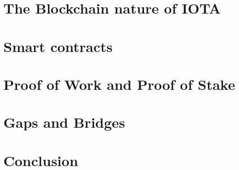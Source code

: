 \documentclass[a4paper,12pt,twoside]{book}
\begin{document}
\section{The Blockchain nature of IOTA}
\label{sec:IOTABlockchainNature}

\section{Smart contracts}
\label{sec:SmartContracts}

\section{Proof of Work and Proof of Stake}
\label{sec:PoWandPoS}


\section{Gaps and Bridges}
\label{sec:GapsBridges}

\section{Conclusion}
\label{sec:Conclusion}


\end{document}
